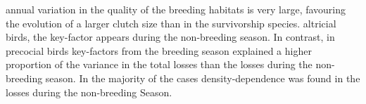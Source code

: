 annual variation in the quality of the breeding habitats is very large, favouring the evolution of a larger clutch size than in the survivorship species. altricial birds, the key-factor appears during the non-breeding season. In contrast, in precocial birds key-factors from the breeding season explained a higher proportion of the variance in the total losses than the losses during the non-breeding season. In the majority of the cases density-dependence was found in the losses during the non-breeding Season.                                                                                                                                                                                                                                                                                            \\

